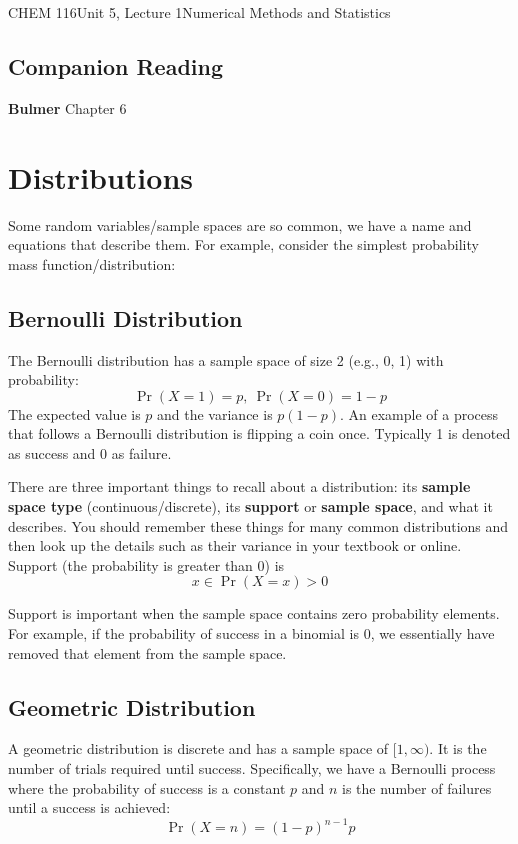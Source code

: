 \documentclass{article}
\begin{document}
\begin{tdoc}{CHEM 116}{Unit 5, Lecture 1}{Numerical Methods and Statistics}

  \subsection*{Companion Reading}
  \textbf{Bulmer} Chapter 6

\section{Distributions}

Some random variables/sample spaces are so common, we have a name and
equations that describe them. For example, consider the simplest
probability mass function/distribution:

\subsection{Bernoulli Distribution}

The Bernoulli distribution has a sample space of size 2 (e.g., 0, 1) with probability:
\begin{equation}
\Pr(X = 1) = p,\: \Pr(X = 0) = 1 - p
\end{equation}
The expected value is $p$ and the variance is $p(1-p)$. An example of
a process that follows a Bernoulli distribution is flipping a coin
once. Typically 1 is denoted as success and 0 as failure.

There are three important things to recall about a distribution: its
{\bf sample space type} (continuous/discrete), its {\bf support} or
{\bf sample space}, and what it describes. You should remember these
things for many common distributions and then look up the details such
as their variance in your textbook or online. Support (the probability
is greater than $0$) is
\begin{equation}
x \in \Pr(X = x) > 0
\end{equation}

Support is important when the sample space contains zero probability
elements. For example, if the probability of success in a binomial is
0, we essentially have removed that element from the sample space.

\subsection{Geometric Distribution}
A geometric distribution is discrete and has a sample space of
$[1,\infty)$. It is the number of trials required until
  success. Specifically, we have a Bernoulli process where the
  probability of success is a constant $p$ and $n$ is the number of
  failures until a success is achieved:
\begin{equation}
\Pr(X = n) = (1 - p)^{n - 1}p
\end{equation}


\end{tdoc}
\end{document}
